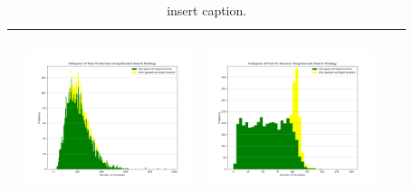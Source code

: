 \begin{landscape}
\begin{table}[h!]
\begin{tabular}{ | c | c | c | c | c |}
\begin{minipage}[c][49mm][c]{49mm}
    \end{minipage}
    &
    \begin{minipage}[c][49mm][c]{49mm}
      \includegraphics[width=49mm, height=49mm]{Chapters/MultiAgentTargetDetection/Figs/Histograms/MultipleAgent/3/SingleAgentSingleSource3RandomHistogram.png}
    \end{minipage}
    &
    \begin{minipage}[c][49mm][c]{49mm}
      \includegraphics[width=49mm, height=49mm]{Chapters/MultiAgentTargetDetection/Figs/Histograms/MultipleAgent/3/SingleAgentSingleSource3SaccadicHistogram.png}
    \end{minipage}
    \\
    \hline
   
  \end{tabular}
  \caption{insert caption. }\label{table:ORToolsResults}
\end{table}


\end{landscape}
